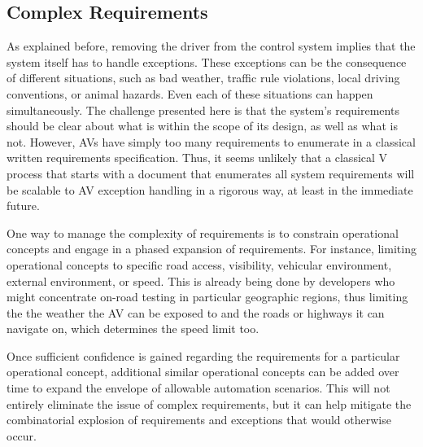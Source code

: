 \documentclass[a4paper, 10pt]{article}
\begin{document}
\subsection{Complex Requirements}
\label{ssec:requirements}
As explained before, removing the driver from the control system implies that the system itself has to handle exceptions. These exceptions can be the consequence of different situations, such as bad weather, traffic rule violations, local driving conventions, or animal hazards. Even each of these situations can happen simultaneously. The challenge presented here is that the system's requirements should be clear about what is within the scope of its design, as well as what is not. However, AVs have simply too many requirements to enumerate in a classical written requirements specification. Thus, it seems unlikely that a classical V process that starts with a document that enumerates all system requirements will be scalable to AV exception handling in a rigorous way, at least in the immediate future.

One way to manage the complexity of requirements is to constrain operational concepts and engage in a phased expansion of requirements. For instance, limiting operational concepts to specific road access, visibility, vehicular environment, external environment, or speed. This is already being done by developers who might concentrate on-road testing in particular geographic regions, thus limiting the the weather the AV can be exposed to and the roads or highways it can navigate on, which determines the speed limit too.

Once sufficient confidence is gained regarding the requirements for a particular operational concept, additional similar operational concepts can be added over time to expand the envelope of allowable automation scenarios. This will not entirely eliminate the issue of complex requirements, but it can help mitigate the combinatorial explosion of requirements and exceptions that would otherwise occur.
\end{document}
